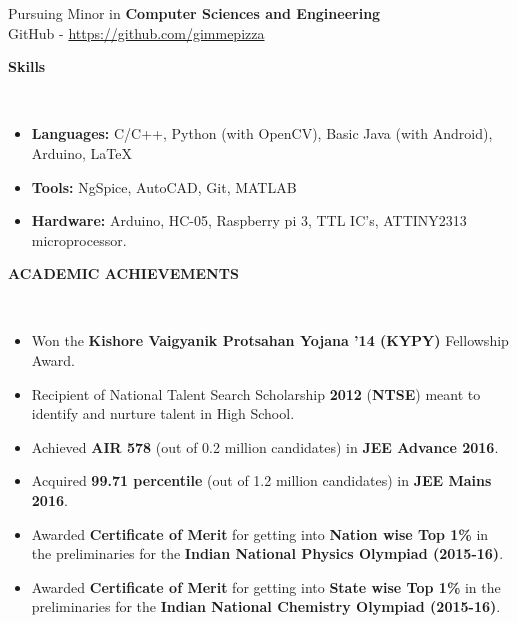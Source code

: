 \documentclass[a4paper,10pt]{article}
\newcommand{\lsep}{-0.5cm}
\newcommand{\resheading}[1]{{\small \colorbox{mygrey}{\begin{minipage}{0.975\textwidth}{\textbf{#1 \vphantom{p\^{E}}}}\end{minipage}}}}
\newcommand{\resheadings}[1]{{\small \colorbox{mywhite}{\begin{minipage}{0.975\textwidth}{\textbf{#1 \vphantom{p\^{E}}}}\end{minipage}}}}
\begin{document}
\hspace{0.5cm}\\[-0.2cm]

\indent  \\

\resheadings{}\\[\lsep]
\\ \\
\\ \\ \\ 
\\ \\
\indent \indent Pursuing Minor in \textbf{Computer Sciences and Engineering} \\
\indent \indent GitHub - \href{https://github.com/gimmepizza}{https://github.com/gimmepizza}
\\

\resheading {\textbf{Skills} }\\[\lsep]
\begin{itemize}
\item \textbf{Languages:} C/C++, Python (with OpenCV), Basic Java (with Android), Arduino, \LaTeX
\item \textbf{Tools:} NgSpice, AutoCAD, Git, MATLAB
\item \textbf{Hardware:} Arduino, HC-05, Raspberry pi 3, TTL IC's, ATTINY2313 microprocessor.

\end{itemize}

\resheading{\textbf{ACADEMIC ACHIEVEMENTS} }\\[\lsep]
\begin{itemize}
\setlength\itemsep{0.05em}
\item Won the \textbf {Kishore Vaigyanik Protsahan Yojana '14 (KYPY)} Fellowship Award.
\item \noindent Recipient of National Talent Search Scholarship \textbf{2012} (\textbf{NTSE}) meant to identify and nurture talent in High School.

\item \noindent Achieved \textbf{AIR 578} (out of 0.2 million candidates) in \textbf{JEE Advance 2016}.
\item \noindent Acquired \textbf{99.71 percentile} (out of 1.2 million candidates) in \textbf{JEE Mains 2016}.

\item \noindent Awarded \textbf{Certificate of Merit} for getting into \textbf{Nation wise Top 1\%} in the preliminaries for the \textbf{Indian National Physics Olympiad (2015-16)}.

\item \noindent Awarded \textbf{Certificate of Merit} for getting into \textbf{State wise Top 1\%} in the preliminaries for the \textbf{Indian National Chemistry Olympiad (2015-16)}.


\end{itemize}
\end{document}
